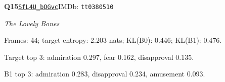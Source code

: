 \par\noindent\begin{minipage}{\textwidth}\small
\textbf{Q15}\quad\href{https://www.youtube.com/watch?v=SfL4U_bOGvc}{\texttt{SfL4U\_bOGvc}}\quad IMDb: \texttt{tt0380510}\par
\textit{The Lovely Bones}\par
Frames: 44; target entropy: 2.203 nats; KL(B0): 0.446; KL(B1): 0.476.\par
Target top 3: admiration 0.297, fear 0.162, disapproval 0.135.\par
B1 top 3: admiration 0.283, disapproval 0.234, amusement 0.093.\par
\end{minipage}\par\medskip
